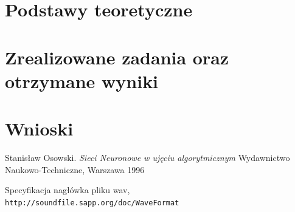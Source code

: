\documentclass{article}
\begin{document}
\section{Podstawy teoretyczne}


\section{Zrealizowane zadania oraz otrzymane wyniki}


\section{Wnioski}



\newpage
\begin{thebibliography}{9}

Stanisław Osowski.
\textit{Sieci Neuronowe w ujęciu algorytmicznym}
Wydawnictwo Naukowo-Techniczne, Warszawa 1996

Specyfikacja nagłówka pliku wav,
\\\texttt{http://soundfile.sapp.org/doc/WaveFormat}

\end{thebibliography}
\end{document}
